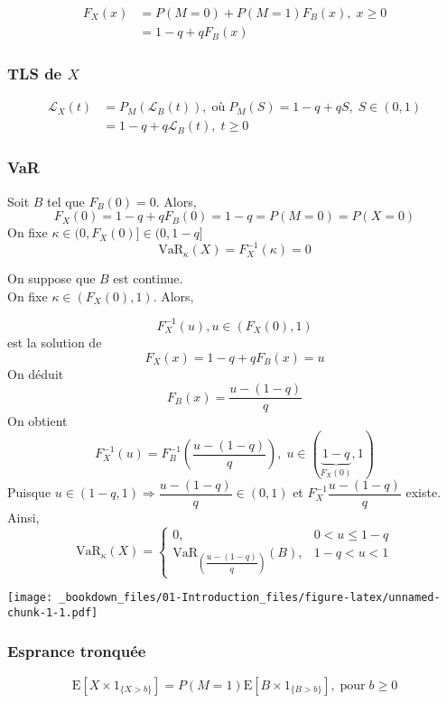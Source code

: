 \begin{align*}
F_X(x)& =P(M=0)+P(M=1)F_B(x),\;x\geq 0\\
& =1-q+q F_B(x)
\end{align*}

\subsubsection*{TLS de \(X\)}\label{tls-de-x-1}

\begin{align*}
\mathcal{L}_X(t)& = P_M(\mathcal{L}_B(t)),\; \text{où}\; P_M(S)=1-q+qS,\; S\in (0,1)\\
& =1-q+q\mathcal{L}_B(t),\;t \geq 0
\end{align*}

\subsubsection*{VaR}\label{var}

Soit \(B\) tel que \(F_B(0)=0\). Alors, \[
F_X(0)=1-q+ qF_B(0)=1-q=P(M=0)=P(X=0)
\] On fixe \(\kappa \in (0,F_X(0)] \in (0,1-q]\) \[
\text{VaR}_\kappa (X) =F_X^{-1}(\kappa)=0
\]

On suppose que \(B\) est continue.\\
On fixe \(\kappa \in (F_X(0),1)\). Alors,

\[
F_X^{-1}(u), u \in (F_X(0),1)
\] est la solution de \[
F_X(x) =1-q+qF_B(x)=u
\] On déduit \[
F_B(x) =\dfrac{u-(1-q)}{q}
\] On obtient \[
F_X^{-1}(u) =F_B^{-1} \left( \dfrac{u-(1-q)}{q} \right),\;u\in(\underbrace{1-q}_{F_X(0)},1)
\] Puisque \(u\in(1-q,1)\Rightarrow \dfrac{u-(1-q)}{q}\in(0,1)\) et
\(F_X^{-1}{\dfrac{u-(1-q)}{q}}\) existe.\\
Ainsi, \[
\text{VaR}_\kappa (X) = 
\begin{cases}
0,& 0<u\leq 1-q\\
\text{VaR}_{\left({\dfrac{u-(1-q)}{q}}\right)} (B),& 1-q<u<1
\end{cases}
\]

\texttt{[image: \_bookdown\_files/01-Introduction\_files/figure-latex/unnamed-chunk-1-1.pdf]}

\subsubsection*{Esprance tronquée}\label{esprance-tronquee}

\[
\text{E}\left [X\times 1_{\{X>b\}}\right ]=P(M=1)\text{E}\left [B\times 1_{\{B>b\}}\right ],\; \text{pour}\;b\geq 0
\]

